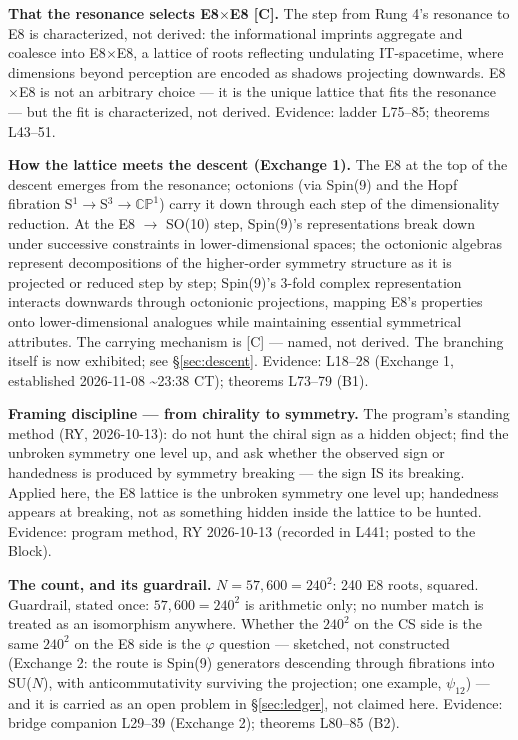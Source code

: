 \documentclass{alienfolio}
\begin{document}
\noindent\textbf{That the resonance selects E8$\times$E8 [C].} The step from Rung 4's resonance to E8 is characterized, not derived: the informational imprints aggregate and coalesce into E8$\times$E8, a lattice of roots reflecting undulating IT-spacetime, where dimensions beyond perception are encoded as shadows projecting downwards. E8$\times$E8 is not an arbitrary choice --- it is the unique lattice that fits the resonance --- but the fit is characterized, not derived. Evidence: ladder L75--85; theorems L43--51.

\noindent\textbf{How the lattice meets the descent (Exchange 1).} The E8 at the top of the descent emerges from the resonance; octonions (via Spin(9) and the Hopf fibration S$^1\to$S$^3\to\mathbb{CP}^1$) carry it down through each step of the dimensionality reduction. At the E8 $\to$ SO(10) step, Spin(9)'s representations break down under successive constraints in lower-dimensional spaces; the octonionic algebras represent decompositions of the higher-order symmetry structure as it is projected or reduced step by step; Spin(9)'s 3-fold complex representation interacts downwards through octonionic projections, mapping E8's properties onto lower-dimensional analogues while maintaining essential symmetrical attributes. The carrying mechanism is [C] --- named, not derived. The branching itself is now exhibited; see \S\ref{sec:descent}. Evidence:  L18--28 (Exchange 1, established 2026-11-08 \textasciitilde23:38 CT); theorems L73--79 (B1).

\noindent\textbf{Framing discipline --- from chirality to symmetry.} The program's standing method (RY, 2026-10-13): do not hunt the chiral sign as a hidden object; find the unbroken symmetry one level up, and ask whether the observed sign or handedness is produced by symmetry breaking --- the sign IS its breaking. Applied here, the E8 lattice is the unbroken symmetry one level up; handedness appears at breaking, not as something hidden inside the lattice to be hunted. Evidence: program method, RY 2026-10-13 (recorded in  L441; posted to the Block).

\noindent\textbf{The count, and its guardrail.} $N = 57{,}600 = 240^2$: 240 E8 roots, squared. Guardrail, stated once: $57{,}600 = 240^2$ is arithmetic only; no number match is treated as an isomorphism anywhere. Whether the $240^2$ on the CS side is the same $240^2$ on the E8 side is the $\varphi$ question --- sketched, not constructed (Exchange 2: the route is Spin(9) generators descending through fibrations into SU($N$), with anticommutativity surviving the projection; one example, $\psi_{12}$) --- and it is carried as an open problem in \S\ref{sec:ledger}, not claimed here. Evidence: bridge companion L29--39 (Exchange 2); theorems L80--85 (B2).
\end{document}
